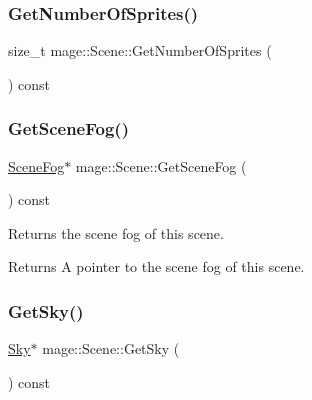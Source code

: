 \hypertarget{classmage_1_1_scene_a124042421abfee563342e50032d4051f}{}\label{classmage_1_1_scene_a124042421abfee563342e50032d4051f} 
\subsubsection{\texorpdfstring{Get\+Number\+Of\+Sprites()}{GetNumberOfSprites()}}
{\footnotesize\ttfamily size\+\_\+t mage\+::\+Scene\+::\+Get\+Number\+Of\+Sprites (\begin{DoxyParamCaption}{ }\end{DoxyParamCaption}) const\hspace{0.3cm}{\ttfamily [noexcept]}}

\hypertarget{classmage_1_1_scene_a1f21d92feb659477ceb4642322fa2f0c}{}\label{classmage_1_1_scene_a1f21d92feb659477ceb4642322fa2f0c} 
\subsubsection{\texorpdfstring{Get\+Scene\+Fog()}{GetSceneFog()}}
{\footnotesize\ttfamily \hyperlink{classmage_1_1_scene_fog}{Scene\+Fog}$\ast$ mage\+::\+Scene\+::\+Get\+Scene\+Fog (\begin{DoxyParamCaption}{ }\end{DoxyParamCaption}) const\hspace{0.3cm}{\ttfamily [noexcept]}}

Returns the scene fog of this scene.

\begin{DoxyReturn}{Returns}
A pointer to the scene fog of this scene. 
\end{DoxyReturn}
\hypertarget{classmage_1_1_scene_afecf68ec8c48d4c28082f99d8042e700}{}\label{classmage_1_1_scene_afecf68ec8c48d4c28082f99d8042e700} 
\subsubsection{\texorpdfstring{Get\+Sky()}{GetSky()}}
{\footnotesize\ttfamily \hyperlink{classmage_1_1_sky}{Sky}$\ast$ mage\+::\+Scene\+::\+Get\+Sky (\begin{DoxyParamCaption}{ }\end{DoxyParamCaption}) const\hspace{0.3cm}{\ttfamily [noexcept]}}


